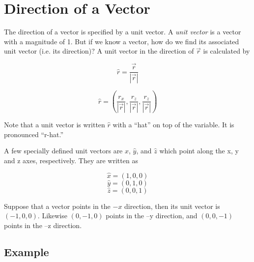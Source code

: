 \section*{Direction of a Vector}

The direction of a vector is specified by a unit vector. A \emph{unit vector} is a vector with a magnitude of 1. But if we know a vector, how do we find its associated unit vector (i.e. its direction)?  A unit vector in the direction of $\vec{r}$ is calculated by

\begin{equation*}
	\hat{r} = \frac{\vec{r}}{|\vec{r}|}
\end{equation*}

\begin{equation*}
	\hat{r} = \left(\frac{r_x}{|\vec{r}|}, \frac{r_z}{|\vec{r}|}, \frac{r_z}{|\vec{r}|}\right)
\end{equation*}

Note that a unit vector is written $\hat{r}$ with a ``hat'' on top of the variable. It is pronounced ``r-hat.''

A few specially defined unit vectors are $\hat{x}$, $\hat{y}$, and $\hat{z}$ which point along the x, y and z axes, respectively. They are written as

\begin{equation*}
	\hat{x} = (1, 0, 0)
\end{equation*}
\begin{equation*}
	\hat{y} = (0, 1, 0)
\end{equation*}
\begin{equation*}
	\hat{z} = (0, 0, 1)
\end{equation*}

Suppose that a vector points in the $-x$ direction, then its unit vector is $(-1, 0, 0)$. Likewise $(0,-1,0)$ points in the --y direction, and $(0,0,-1)$ points in the --z direction.

\subsection*{Example}


